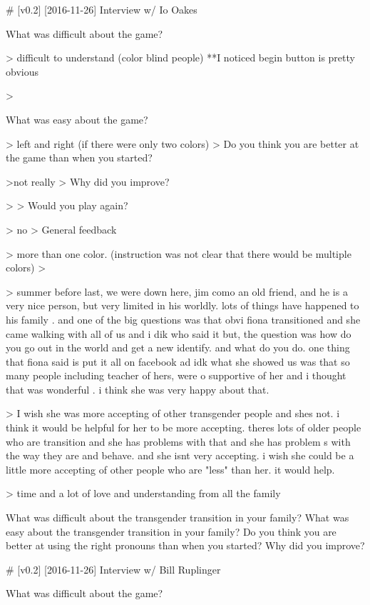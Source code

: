 # [v0.2] [2016-11-26] Interview w/ Io Oakes

What was difficult about the game?

    > difficult to understand (color blind people) **I noticed begin button is pretty obvious

    > 

What was easy about the game?

    > left and right (if there were only two colors)
    >
Do you think you are better at the game than when you started?

    >not really
    >
Why did you improve?

    > 
    >
Would you play again?

    > no
    >
General feedback

    > more than one color. (instruction was not clear that there would be multiple colors)
    >
    
    > summer before last, we were down here, jim como an old friend, and he is a very nice person, but very limited in his worldly. lots of things have happened to his family . and one of the big questions was that obvi fiona transitioned and she came walking with all of us and i dik who said it but, the question was how do you go out in the world and get a new identify. and what do you do. one thing that fiona said is put it all on facebook ad idk what she showed us was that so many people including teacher of hers, were o supportive of her and i thought that was wonderful . i think she was very happy about that. 
    
    > I wish she was more accepting of other transgender people and shes not. i think it would be helpful for her to be more accepting. theres lots of older people who are transition and she has problems with that and she has problem s with the way they are and behave. and she isnt very accepting. i wish she could be a little more accepting of other people who are "less" than her. it would help.
    
    > time and a lot of love and understanding from all the family
    
What was difficult about the transgender transition in your family?
What was easy about the transgender transition in your family?
Do you think you are better at using the right pronouns than when you started?
Why did you improve?


# [v0.2] [2016-11-26] Interview w/ Bill Ruplinger

What was difficult about the game?

